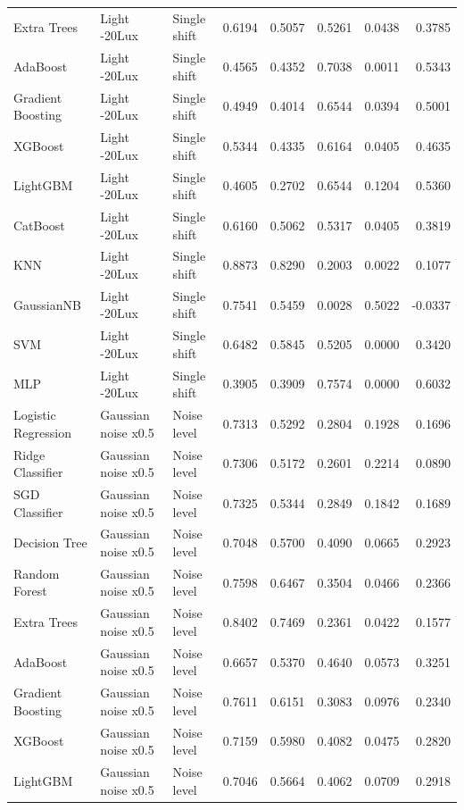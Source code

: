 \begin{tabular}{lllrrrrr}
Extra Trees & Light -20Lux & Single shift & 0.6194 & 0.5057 & 0.5261 & 0.0438 & 0.3785 \\
AdaBoost & Light -20Lux & Single shift & 0.4565 & 0.4352 & 0.7038 & 0.0011 & 0.5343 \\
Gradient Boosting & Light -20Lux & Single shift & 0.4949 & 0.4014 & 0.6544 & 0.0394 & 0.5001 \\
XGBoost & Light -20Lux & Single shift & 0.5344 & 0.4335 & 0.6164 & 0.0405 & 0.4635 \\
LightGBM & Light -20Lux & Single shift & 0.4605 & 0.2702 & 0.6544 & 0.1204 & 0.5360 \\
CatBoost & Light -20Lux & Single shift & 0.6160 & 0.5062 & 0.5317 & 0.0405 & 0.3819 \\
KNN & Light -20Lux & Single shift & 0.8873 & 0.8290 & 0.2003 & 0.0022 & 0.1077 \\
GaussianNB & Light -20Lux & Single shift & 0.7541 & 0.5459 & 0.0028 & 0.5022 & -0.0337 \\
SVM & Light -20Lux & Single shift & 0.6482 & 0.5845 & 0.5205 & 0.0000 & 0.3420 \\
MLP & Light -20Lux & Single shift & 0.3905 & 0.3909 & 0.7574 & 0.0000 & 0.6032 \\
Logistic Regression & Gaussian noise x0.5 & Noise level & 0.7313 & 0.5292 & 0.2804 & 0.1928 & 0.1696 \\
Ridge Classifier & Gaussian noise x0.5 & Noise level & 0.7306 & 0.5172 & 0.2601 & 0.2214 & 0.0890 \\
SGD Classifier & Gaussian noise x0.5 & Noise level & 0.7325 & 0.5344 & 0.2849 & 0.1842 & 0.1689 \\
Decision Tree & Gaussian noise x0.5 & Noise level & 0.7048 & 0.5700 & 0.4090 & 0.0665 & 0.2923 \\
Random Forest & Gaussian noise x0.5 & Noise level & 0.7598 & 0.6467 & 0.3504 & 0.0466 & 0.2366 \\
Extra Trees & Gaussian noise x0.5 & Noise level & 0.8402 & 0.7469 & 0.2361 & 0.0422 & 0.1577 \\
AdaBoost & Gaussian noise x0.5 & Noise level & 0.6657 & 0.5370 & 0.4640 & 0.0573 & 0.3251 \\
Gradient Boosting & Gaussian noise x0.5 & Noise level & 0.7611 & 0.6151 & 0.3083 & 0.0976 & 0.2340 \\
XGBoost & Gaussian noise x0.5 & Noise level & 0.7159 & 0.5980 & 0.4082 & 0.0475 & 0.2820 \\
LightGBM & Gaussian noise x0.5 & Noise level & 0.7046 & 0.5664 & 0.4062 & 0.0709 & 0.2918 \\

\end{tabular}
